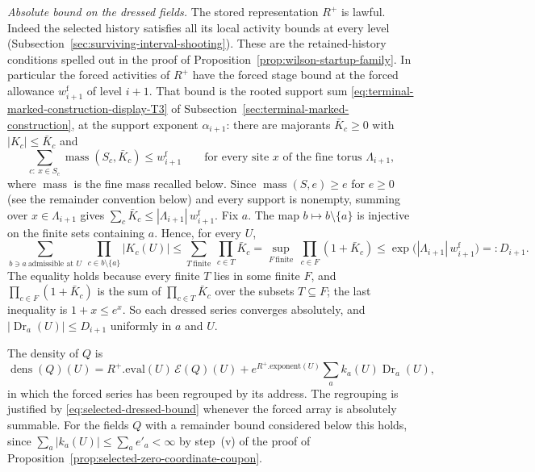 \emph{Absolute bound on the dressed fields.} The stored representation
$R^+$ is lawful. Indeed the selected history satisfies all its local
activity bounds at every level
(Subsection~\ref{sec:surviving-interval-shooting}). These are the
retained-history conditions spelled out in the proof of
Proposition~\ref{prop:wilson-startup-family}. In particular the forced
activities of $R^+$ have the forced stage bound at the forced allowance
$w^{\mathrm f}_{i+1}$ of level $i+1$. That bound is the rooted support
sum \eqref{eq:terminal-marked-construction-display-T3} of Subsection~\ref{sec:terminal-marked-construction}, at the
support exponent $\alpha_{i+1}$: there are majorants $\bar K_c\ge0$
with $|K_c|\le\bar K_c$ and
\[
 \sum_{c:\ x\in S_c}\operatorname{mass}(S_c,\bar K_c)\le w^{\mathrm f}_{i+1}
 \qquad\text{for every site $x$ of the fine torus $\Lambda_{i+1}$,}
\]
where $\operatorname{mass}$ is the fine mass recalled below. Since
$\operatorname{mass}(S,e)\ge e$ for $e\ge0$ (see the remainder
convention below) and every support is nonempty, summing over
$x\in\Lambda_{i+1}$ gives
$\sum_c\bar K_c\le|\Lambda_{i+1}|\,w^{\mathrm f}_{i+1}$. Fix $a$. The map
$b\mapsto b\setminus\{a\}$ is injective on the finite sets containing
$a$. Hence, for every $U$,
\begin{equation}\label{eq:selected-dressed-bound}
 \sum_{b\ni a\ \text{admissible at }U}\ \prod_{c\in b\setminus\{a\}}|K_c(U)|
 \le\sum_{T\ \text{finite}}\ \prod_{c\in T}\bar K_c
 =\sup_{F\ \text{finite}}\ \prod_{c\in F}(1+\bar K_c)
 \le\exp\bigl(|\Lambda_{i+1}|\,w^{\mathrm f}_{i+1}\bigr)=:D_{i+1}.
\end{equation}
The equality holds because every finite $T$ lies in some finite $F$,
and $\prod_{c\in F}(1+\bar K_c)$ is the sum of
$\prod_{c\in T}\bar K_c$ over the subsets $T\subseteq F$; the last
inequality is $1+x\le e^x$. So each dressed series converges absolutely,
and $|\operatorname{Dr}_a(U)|\le D_{i+1}$ uniformly in $a$ and $U$.

The density of $Q$ is
\[
 \operatorname{dens}(Q)(U)=R^+.\mathrm{eval}(U)\,\mathcal E(Q)(U)
   +e^{R^+.\mathrm{exponent}(U)}\sum_a k_a(U)\operatorname{Dr}_a(U),
\]
in which the forced series has been regrouped by its address. The
regrouping is justified by \eqref{eq:selected-dressed-bound}
whenever the forced array is absolutely summable. For the fields $Q$
with a remainder bound considered below this holds, since
$\sum_a|k_a(U)|\le\sum_ae'_a<\infty$ by step~(v) of the proof of
Proposition~\ref{prop:selected-zero-coordinate-coupon}.

